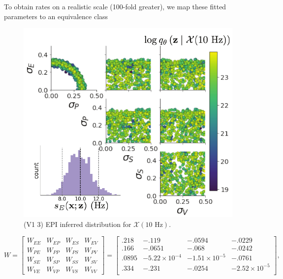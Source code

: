 \documentclass[11pt]{article}
\begin{document}
To obtain rates on a realistic scale (100-fold greater), we map these fitted parameters to an equivalence class

\begin{figure}[h]
\caption{\small (V1 3)
EPI inferred distribution for $\mathcal{X}(10\text{ Hz})$.
 }
 \label{fig:V1_3}
\begin{center}
\includegraphics[scale=.8]{figures/figV1_3/figV1_3.pdf}
\end{center}
\end{figure}

\begin{equation}
W =  \begin{bmatrix} W_{EE} & W_{EP} & W_{ES} & W_{EV} \\
W_{PE} & W_{PP} & W_{PS} & W_{PV} \\
W_{SE} & W_{SP} & W_{SS} & W_{SV} \\
W_{VE} & W_{VP} & W_{VS} & W_{VV}  \end{bmatrix} = 
 \begin{bmatrix} .218 & -.119 & -.0594 & -.0229 \\
 .166 & -.0651 & -.068 & -.0242 \\
 .0895 & -5.22 \times 10^{-4} & -1.51 \times 10^{-5}   & -.0761 \\
 .334 &  -.231 & -.0254  & -2.52 \times 10^{-5} \\
 \end{bmatrix},
\end{equation} 
\end{document}
